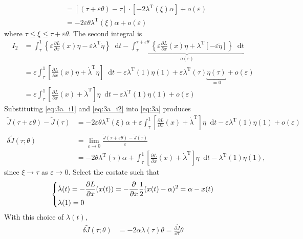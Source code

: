 \documentclass[letterpaper,11pt,titlepage]{article}
\newcommand*\dif{\mathop{}\!\mathrm{d}}
\newcommand{\trans}{^\text{T}}
\newcommand*\pder[2]{\frac{\partial #1}{\partial #2}}
\begin{document}
\begin{enumerate}[leftmargin=0pt]
\begin{enumerate}
\begin{align}
          &= [(\tau+\varepsilon\theta)-\tau] \cdot [-2\lambda\trans(\xi)\alpha] + o(\varepsilon) \\
          &= -2 \varepsilon\theta \lambda\trans(\xi)\alpha + o(\varepsilon) \label{eq:3a_i1}
    \end{align}
    where $\tau\le\xi\le\tau+\varepsilon\theta$. The second integral is
    \begin{align}
      I_2 &= \int_{\tau}^1\! \left\{ \varepsilon\pder{L}{x}(x)\eta - \varepsilon \lambda\trans \dot\eta \right\} \dif t - \underbrace{ \int_\tau^{\tau+\varepsilon\theta}\! \left\{ \varepsilon\pder{L}{x}(x)\eta + \lambda\trans [- \varepsilon\dot\eta] \right\} \dif t }_{o(\varepsilon)} \\
          &= \varepsilon \int_{\tau}^1\! \left[ \pder{L}{x}(x)\eta + \dot\lambda\trans\eta \right] \dif t - \varepsilon \lambda\trans(1)\eta(1) + \varepsilon \lambda\trans(\tau) \underbracket{\eta(\tau)}_{=0} + o(\varepsilon) \\
          &= \varepsilon \int_{\tau}^1\! \left[ \pder{L}{x}(x) + \dot\lambda\trans \right] \eta \dif t - \varepsilon \lambda\trans(1)\eta(1) + o(\varepsilon) \label{eq:3a_i2}
    \end{align}
    Substituting \eqref{eq:3a_i1} and \eqref{eq:3a_i2} into \eqref{eq:3a} produces
    \begin{align}
      \tilde J(\tau+\varepsilon\theta) - \tilde J(\tau) &= -2 \varepsilon\theta \lambda\trans(\xi)\alpha + \varepsilon \int_{\tau}^1\! \left[ \pder{L}{x}(x) + \dot\lambda\trans \right] \eta \dif t - \varepsilon \lambda\trans(1)\eta(1) + o(\varepsilon) \\
      \delta \tilde J(\tau;\theta) &= \lim_{\varepsilon\to0} \frac{\tilde J(\tau+\varepsilon\theta)-\tilde J(\tau)}{\varepsilon} \\
                                                        &= -2 \theta \lambda\trans(\tau)\alpha +  \int_{\tau}^1\! \left[ \pder{L}{x}(x) + \dot\lambda\trans \right] \eta \dif t -  \lambda\trans(1)\eta(1) ,
    \end{align}
    since $\xi\to\tau$ as $\varepsilon\to0$. Select the costate such that
    \[
      \begin{dcases}
        \dot\lambda(t) = -\pder{L}{x}(x(t)) = -\pder{}{x} \frac{1}{2} (x(t)-\alpha)^2 = \alpha-x(t) \\
        \lambda(1) = 0
      \end{dcases}
    \]
    With this choice of $\lambda(t)$,
    \begin{align}
      \delta \tilde J(\tau;\theta) &= -2\alpha\lambda(\tau) \theta = \pder{\tilde J}{\tau} \theta \\

\end{align}
\end{enumerate}
\end{enumerate}
\end{document}
